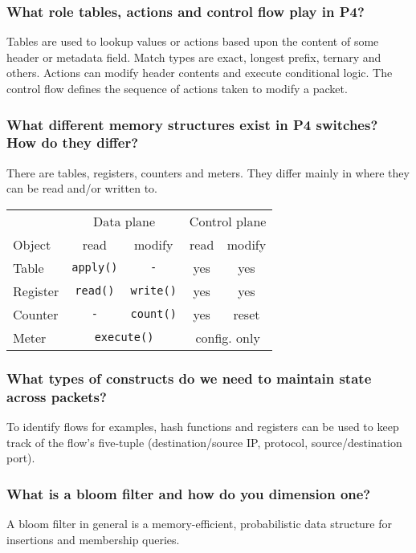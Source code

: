 \documentclass[a4paper, fontsize=8pt, landscape, DIV=1]{scrartcl}
\begin{document}
\begin{multicols*}{4}
  \subsubsection{What role tables, actions and control flow play in P4?}
  Tables are used to lookup values or actions based upon the content of some header
  or metadata field. Match types are exact, longest prefix, ternary and others. 
  Actions can modify header contents and execute conditional logic. The control 
  flow defines the sequence of actions taken to modify a packet.

  \subsubsection{What different memory structures exist in P4 switches? How do they differ?}
  There are tables, registers, counters and meters. They differ mainly in where they
  can be read and/or written to.
  \begin{tabularx}{\linewidth}{l c c c c}
    \\ \hline
    {} & \multicolumn{2}{c}{Data plane} & \multicolumn{2}{c}{Control plane} \\ 
    Object & read & modify & read & modify \\
    \hline
    Table & \texttt{apply()} & \texttt{-} & yes & yes \\
    Register & \texttt{read()} & \texttt{write()} & yes & yes \\
    Counter & \texttt{-} & \texttt{count()} & yes & reset \\
    Meter & \multicolumn{2}{c}{\texttt{execute()}} & \multicolumn{2}{c}{config. only}
  \end{tabularx}

  \subsubsection{What types of constructs do we need to maintain state across packets?}
  To identify flows for examples, hash functions and registers can be used to keep
  track of the flow's five-tuple (destination/source IP, protocol, source/destination port).

  \subsubsection{What is a bloom filter and how do you dimension one?}
  A bloom filter in general is a memory-efficient, probabilistic data structure for
  insertions and membership queries.


\end{multicols*}
\end{document}
